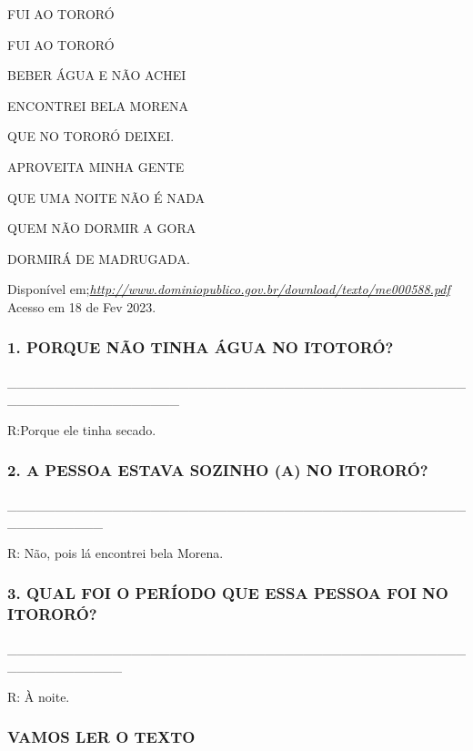 FUI AO TORORÓ

FUI AO TORORÓ

BEBER ÁGUA E NÃO ACHEI

ENCONTREI BELA MORENA

QUE NO TORORÓ DEIXEI.

APROVEITA MINHA GENTE

QUE UMA NOITE NÃO É NADA

QUEM NÃO DORMIR A GORA

DORMIRÁ DE MADRUGADA.

Disponível
em;\href{http://www.dominiopublico.gov.br/download/texto/me000588.pdf}{\emph{http://www.dominiopublico.gov.br/download/texto/me000588.pdf}}
Acesso em 18 de Fev 2023.

\subsubsection{1. PORQUE NÃO TINHA ÁGUA NO
ITOTORÓ?}\label{porque-nuxe3o-tinha-no-itotoruxf3}

\_\_\_\_\_\_\_\_\_\_\_\_\_\_\_\_\_\_\_\_\_\_\_\_\_\_\_\_\_\_\_\_\_\_\_\_\_\_\_\_\_\_\_\_\_\_\_\_\_\_\_\_\_\_\_\_\_\_\_\_\_\_\_\_\_\_

R:Porque ele tinha secado.

\subsubsection{2. A PESSOA ESTAVA SOZINHO (A) NO
ITORORÓ?}\label{a-pessoa-estava-sozinho-a-no-itororuxf3}

\_\_\_\_\_\_\_\_\_\_\_\_\_\_\_\_\_\_\_\_\_\_\_\_\_\_\_\_\_\_\_\_\_\_\_\_\_\_\_\_\_\_\_\_\_\_\_\_\_\_\_\_\_\_\_\_\_\_

R: Não, pois lá encontrei bela Morena.

\subsubsection{3. QUAL FOI O PERÍODO QUE ESSA PESSOA FOI NO
ITORORÓ?}\label{qual-foi-o-peruxedodo-que-essa-pessoa-foi-no-itororuxf3}

\_\_\_\_\_\_\_\_\_\_\_\_\_\_\_\_\_\_\_\_\_\_\_\_\_\_\_\_\_\_\_\_\_\_\_\_\_\_\_\_\_\_\_\_\_\_\_\_\_\_\_\_\_\_\_\_\_\_\_\_

R: À noite.

\subsubsection{VAMOS LER O TEXTO}\label{vamos-ler-o-texto}


